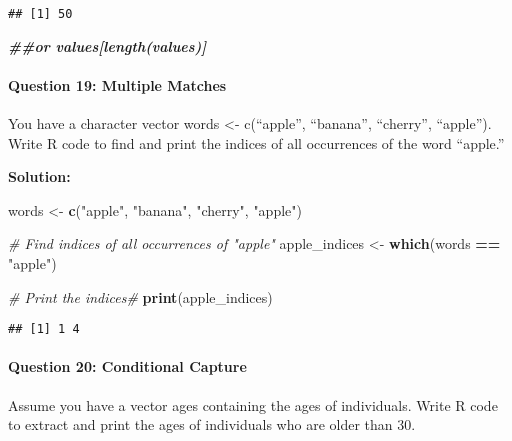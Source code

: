 \documentclass[
]{article}
\newenvironment{Shaded}{\begin{snugshade}}{\end{snugshade}}
\newcommand{\CommentTok}[1]{\textcolor[rgb]{0.56,0.35,0.01}{\textit{#1}}}
\newcommand{\DocumentationTok}[1]{\textcolor[rgb]{0.56,0.35,0.01}{\textbf{\textit{#1}}}}
\newcommand{\FunctionTok}[1]{\textcolor[rgb]{0.13,0.29,0.53}{\textbf{#1}}}
\newcommand{\NormalTok}[1]{#1}
\newcommand{\OtherTok}[1]{\textcolor[rgb]{0.56,0.35,0.01}{#1}}
\newcommand{\SpecialCharTok}[1]{\textcolor[rgb]{0.81,0.36,0.00}{\textbf{#1}}}
\newcommand{\StringTok}[1]{\textcolor[rgb]{0.31,0.60,0.02}{#1}}
\begin{document}
\begin{verbatim}
## [1] 50
\end{verbatim}

\begin{Shaded}
\begin{Highlighting}[]
\DocumentationTok{\#\#or values[length(values)]}
\end{Highlighting}
\end{Shaded}

\hypertarget{question-19-multiple-matches}{%
\paragraph{Question 19: Multiple
Matches}\label{question-19-multiple-matches}}

You have a character vector words \textless- c(``apple'', ``banana'',
``cherry'', ``apple''). Write R code to find and print the indices of
all occurrences of the word ``apple.''

\textbf{Solution:}

\begin{Shaded}
\begin{Highlighting}[]
\NormalTok{words }\OtherTok{\textless{}{-}} \FunctionTok{c}\NormalTok{(}\StringTok{"apple"}\NormalTok{, }\StringTok{"banana"}\NormalTok{, }\StringTok{"cherry"}\NormalTok{, }\StringTok{"apple"}\NormalTok{)}

\CommentTok{\# Find indices of all occurrences of "apple"}
\NormalTok{apple\_indices }\OtherTok{\textless{}{-}} \FunctionTok{which}\NormalTok{(words }\SpecialCharTok{==} \StringTok{"apple"}\NormalTok{)}

\CommentTok{\# Print the indices\#}
\FunctionTok{print}\NormalTok{(apple\_indices)}
\end{Highlighting}
\end{Shaded}

\begin{verbatim}
## [1] 1 4
\end{verbatim}

\hypertarget{question-20-conditional-capture}{%
\paragraph{Question 20: Conditional
Capture}\label{question-20-conditional-capture}}

Assume you have a vector ages containing the ages of individuals. Write
R code to extract and print the ages of individuals who are older than
30.
\end{document}
